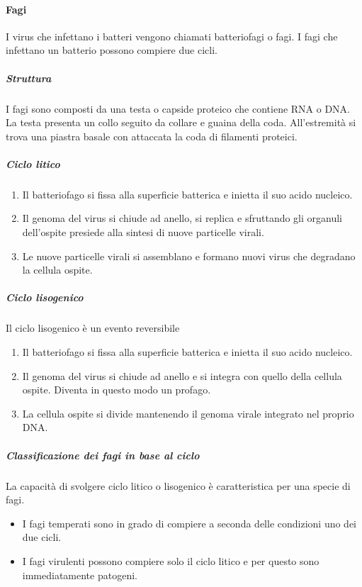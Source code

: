 			\paragraph{Fagi}
			I virus che infettano i batteri vengono chiamati batteriofagi o fagi.
			I fagi che infettano un batterio possono compiere due cicli.

				\subparagraph{Struttura}
				I fagi sono composti da una testa o capside proteico che contiene RNA o DNA.
				La testa presenta un collo seguito da collare e guaina della coda.
				All'estremità si trova una piastra basale con attaccata la coda di filamenti proteici. 

				\subparagraph{Ciclo litico}
				\begin{enumerate}
    					\item Il batteriofago si fissa alla superficie batterica e inietta il suo acido nucleico.
    					\item Il genoma del virus si chiude ad anello, si replica e sfruttando gli organuli  dell'ospite presiede alla sintesi di nuove particelle virali.
    					\item Le nuove particelle virali si assemblano e formano nuovi virus che degradano la cellula ospite. 
				\end{enumerate}

				\subparagraph{Ciclo lisogenico}
				Il ciclo lisogenico \`e un evento reversibile
				\begin{enumerate}
    					\item Il batteriofago si fissa alla superficie batterica e inietta il suo acido nucleico.
    					\item Il genoma del virus si chiude ad anello e si integra con quello della cellula ospite.
						Diventa in questo modo un profago.
    					\item La cellula ospite si divide mantenendo il genoma virale integrato nel proprio DNA.
				\end{enumerate}

				\subparagraph{Classificazione dei fagi in base al ciclo}
				La capacit\`a di svolgere ciclo litico o lisogenico \`e caratteristica per una specie di fagi.
				\begin{multicols}{2}
					\begin{itemize}
						\item I fagi temperati sono in grado di compiere a seconda delle condizioni uno dei due cicli.
						\item I fagi virulenti possono compiere solo il ciclo litico e per questo sono immediatamente patogeni.
					\end{itemize}
				\end{multicols}
			
